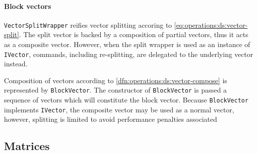\paragraph{Block vectors}

\texttt{VectorSplitWrapper} reifies vector splitting accoring to
\vref{eq:operations:ds:vector-split}. The split vector is backed by a
composition of partial vectors, thus it acts as a composite
vector. However, when the split wrapper is used as an instance of
\texttt{IVector}, commands, including re-splitting, are delegated to
the underlying vector instead.

Composition of vectors according to
\vref{dfn:operations:ds:vector-compose} is represented by
\texttt{BlockVector}. The constructor of \texttt{BlockVector} is
passed a sequence of vectors which will constitute the block
vector. Because \texttt{BlockVector} implements \texttt{IVector}, the
composite vector may be used as a normal vector, however, splitting is
limited to avoid performance penalties associated 

\subsection{Matrices}

